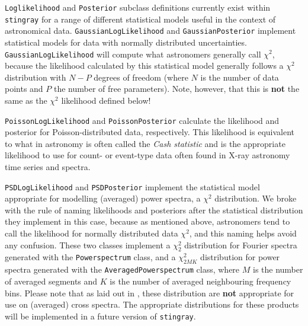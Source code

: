 \documentclass[twocolumn]{aastex62}
\newcommand{\stingray}{\texttt{stingray}\xspace}
\newcommand{\powerspectrum}{\texttt{Powerspectrum}\xspace}
\begin{document}

\texttt{Loglikelihood} and \texttt{Posterior} subclass definitions currently exist within \stingray for a range of different statistical models useful in the context of astronomical data. 
\verb|GaussianLogLikelihood| and \texttt{GaussianPosterior} implement statistical models for data with normally distributed uncertainties. \texttt{GaussianLogLikelihood} will compute what astronomers generally call $\chi^2$, because the likelihood calculated by this statistical model generally follows a $\chi^2$ distribution with $N-P$ degrees of freedom (where $N$ is the number of data points and $P$ the number of free parameters). Note, however, that this is \textbf{not} the same as the $\chi^2$ likelihood defined below!

\texttt{PoissonLogLikelihood} and \texttt{PoissonPosterior} calculate the likelihood and posterior for Poisson-distributed data, respectively. This likelihood is equivalent to what in astronomy is often called the \textit{Cash statistic} \citep{cash1979} and is the appropriate likelihood to use for count- or event-type data often found in X-ray astronomy time series and spectra.

\texttt{PSDLogLikelihood} and \texttt{PSDPosterior} implement the statistical model appropriate for modelling (averaged) power spectra, a $\chi^2$ distribution. We broke with the rule of naming likelihoods and posteriors after the statistical distribution they implement in this case, because as mentioned above, astronomers tend to call the likelihood for normally distributed data $\chi^2$, and this naming helps avoid any confusion. These two classes implement a $\chi^2_2$ distribution for Fourier spectra generated with the \powerspectrum class, and a $\chi^2_{2MK}$ distribution for power spectra generated with the \texttt{AveragedPowerspectrum} class, where $M$ is the number of averaged segments and $K$ is the number of averaged neighbouring frequency bins. Please note that as laid out in \citet{huppenkothen2017}, these distribution are \textbf{not} appropriate for use on (averaged) cross spectra. The appropriate distributions for these products will be implemented in a future version of \stingray.
\end{document}
